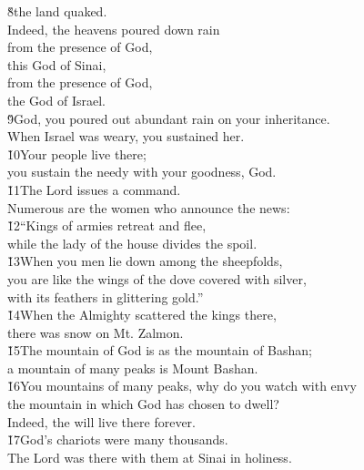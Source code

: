 \begin{poetry}
\poeml \v{8}the land quaked. \\
\poeml Indeed, the heavens poured down rain \\
\poemll    from the presence of God, \\
\poemlll       this God of Sinai, \\
\poemll    from the presence of God, \\
\poemlll       the God of Israel. \\
\poeml \v{9}God, you poured out abundant rain on your inheritance. \\
\poemll    When Israel was weary, you sustained her. \\
\poeml \v{10}Your people live there; \\
\poemll    you sustain the needy with your goodness, God. \\
\poeml \v{11}The Lord issues a command. \\
\poemll    Numerous are the women who announce the news: \\
\poeml \v{12}``Kings of armies retreat and flee, \\
\poemll    while the lady of the house divides the spoil. \\
\poeml \v{13}When you men lie down among the sheepfolds, \\
\poemll    you are like the wings of the dove covered with silver, \\
\poemlll       with its feathers in glittering gold.'' \\
\poeml \v{14}When the Almighty scattered the kings there, \\
\poemll    there was snow on Mt. Zalmon. \\
\poeml \v{15}The mountain of God is as the mountain of Bashan; \\
\poemll    a mountain of many peaks is Mount Bashan. \\
\poeml \v{16}You mountains of many peaks, why do you watch with envy \\
\poemll    the mountain in which God has chosen to dwell? \\
\poemlll       Indeed, the  will live there forever. \\
\poeml \v{17}God's chariots were many thousands. \\
\poemll    The Lord was there with them at Sinai in holiness. \\

\end{poetry}
